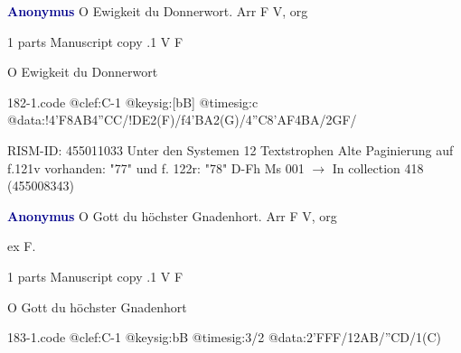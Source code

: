 \documentclass[twocolumn]{book}
\begin{document}
\newline \par \vspace{7pt} \textcolor{darkblue}{\textbf{Anonymus  }}
\newline O Ewigkeit du Donnerwort. Arr  F  
\newline V, org
\newline \begin{itshape}\end{itshape} 
\newline \textcolor{darkblue}{}  1 parts  
\newline Manuscript copy
.1  V  F
\newline \begin{footnotesize} O Ewigkeit du Donnerwort \end{footnotesize}  
\begin{filecontents*}{182-1.code}
@clef:C-1
@keysig:[bB]
@timesig:c
@data:!4'F8AB4''CC/!DE2(F)/f4'BA2(G)/4''C8'AF4BA/2GF/
\end{filecontents*}
\newline
%

\newline RISM-ID: 455011033
\newline Unter den Systemen 12 Textstrophen
\newline Alte Paginierung auf f.121v vorhanden: "77" und f. 122r: "78"
\newline D-Fh  Ms 001
\newline $\rightarrow$ In collection 418 (455008343)

\newline \par \vspace{7pt} \textcolor{darkblue}{\textbf{Anonymus  }}
\newline O Gott du höchster Gnadenhort. Arr  F  
\newline V, org
\newline \begin{itshape}[f.96r, at left:] ex F.\end{itshape} 
\newline \textcolor{darkblue}{}  1 parts  
\newline Manuscript copy
.1  V  F
\newline \begin{footnotesize} O Gott du höchster Gnadenhort \end{footnotesize}  
\begin{filecontents*}{183-1.code}
@clef:C-1
@keysig:bB
@timesig:3/2
@data:2'FFF/12AB/''CD/1(C)
\end{filecontents*}
\newline
%
\end{document}
